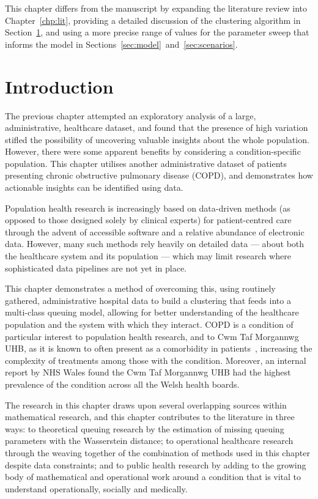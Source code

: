 \myrule%

This chapter differs from the manuscript by expanding the literature review into
Chapter~\ref{chp:lit}, providing a detailed discussion of the clustering
algorithm in Section~\ref{sec:intro}, and using a more precise range of values
for the parameter sweep that informs the model in
Sections~\ref{sec:model}~and~\ref{sec:scenarios}.

\section{Introduction}\label{sec:intro}

The previous chapter attempted an exploratory analysis of a large,
administrative, healthcare dataset, and found that the presence of high
variation stifled the possibility of uncovering valuable insights about the
whole population. However, there were some apparent benefits by considering a
condition-specific population. This chapter utilises another administrative
dataset of patients presenting chronic obstructive pulmonary disease (COPD), and
demonstrates how actionable insights can be identified using data.

Population health research is increasingly based on data-driven methods (as
opposed to those designed solely by clinical experts) for patient-centred care
through the advent of accessible software and a relative abundance of electronic
data. However, many such methods rely heavily on detailed data — about both the
healthcare system and its population — which may limit research where
sophisticated data pipelines are not yet in place.

This chapter demonstrates a method of overcoming this, using routinely gathered,
administrative hospital data to build a clustering that feeds into a multi-class
queuing model, allowing for better understanding of the healthcare population
and the system with which they interact. COPD is a condition of particular
interest to population health research, and to Cwm Taf Morgannwg UHB, as it is
known to often present as a comorbidity in patients~\cite{Houben2019},
increasing the complexity of treatments among those with the condition.
Moreover, an internal report by NHS Wales found the Cwm Taf Morgannwg UHB had
the highest prevalence of the condition across all the Welsh health boards.

The research in this chapter draws upon several overlapping sources within
mathematical research, and this chapter contributes to the literature in three
ways: to theoretical queuing research by the estimation of missing queuing
parameters with the Wasserstein distance; to operational healthcare research
through the weaving together of the combination of methods used in this chapter
despite data constraints; and to public health research by adding to the growing
body of mathematical and operational work around a condition that is vital to
understand operationally, socially and medically.

